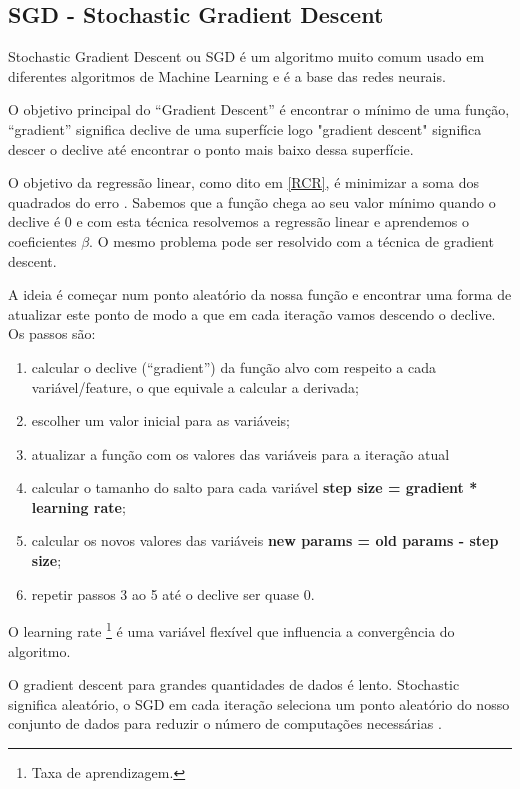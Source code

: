 \subsection{SGD - Stochastic Gradient Descent}

Stochastic Gradient Descent ou SGD é um algoritmo muito comum usado em diferentes algoritmos de Machine Learning e é a base das redes neurais.

O objetivo principal do ``Gradient Descent''  é encontrar o mínimo de uma função, ``gradient'' significa declive de uma superfície logo "gradient descent" significa descer o declive até encontrar o ponto mais baixo dessa superfície.

O objetivo da regressão linear, como dito em \ref{RCR}, é minimizar a soma dos quadrados do erro . Sabemos que a função chega ao seu valor mínimo quando o declive é 0 e com esta técnica resolvemos a regressão linear e aprendemos o coeficientes $\beta$. O mesmo problema pode ser resolvido com a técnica de gradient descent.

A ideia é começar num ponto aleatório da nossa função e encontrar uma forma de atualizar este ponto de modo a que em cada iteração vamos descendo o declive. Os passos são:

\begin{enumerate}
\item calcular o declive (``gradient'') da função alvo com respeito a cada variável/feature, o que equivale a calcular a derivada;
\item escolher um valor inicial para as variáveis;
\item atualizar a função com os valores das variáveis para a iteração atual
\item calcular o tamanho do salto para cada variável \textbf{step size = gradient * learning rate};
\item calcular os novos valores das variáveis \textbf{new params = old params - step size};
\item repetir passos 3 ao 5 até o declive ser quase 0.
\end{enumerate}

O learning rate \footnote{Taxa de aprendizagem.} é uma variável flexível que influencia a convergência do algoritmo.

O gradient descent para grandes quantidades de dados é lento. Stochastic significa aleatório, o SGD em cada iteração seleciona um ponto aleatório do nosso conjunto de dados para reduzir o número de computações necessárias \cite{sgd1}.


